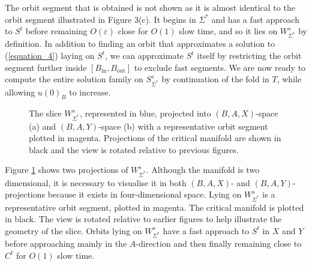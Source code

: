 \documentclass{ws-ijbc}
\begin{document}
The orbit segment that is obtained is not shown as it is almost identical to the orbit segment illustrated in Figure 3(c).  It begins in $\Sigma^*$ and has a fast approach to $S^t$ before remaining $O(\varepsilon)$ close for $O(1)$ slow time, and so it lies on $W^{s}_{\Sigma^*}$ by definition.  In addition to finding an orbit that approximates a solution to (\ref{equation_4}) laying on $S^t$, we can approximate $S^t$ itself by restricting the orbit segment further inside $[B_{\text{in}},B_{\text{out}}]$ to exclude fast segments. We are now ready to compute the entire solution family on $S^s_{\Sigma^*}$ by continuation of the fold in $T$, while allowing $u(0)_B$ to increase.  

\begin{figure}[h]
\centering
{}
\caption{The slice $W^{s}_{\Sigma^*}$, represented in blue, projected into $(B,A,X)$-space (a) and $(B,A,Y)$-space (b) with a representative orbit segment plotted in magenta.  Projections of the critical manifold are shown in black and the view is rotated relative to previous figures.}
\label{piece}
\end{figure}
   
Figure \ref{piece} shows two projections of $W^s_{\Sigma^*}$.  Although the manifold is two dimensional, it is necessary to visualise it in both $(B,A,X)$- and $(B,A,Y)$-projections because it exists in four-dimensional space.  Lying on $W^s_{\Sigma^*}$ is a representative orbit segment, plotted in magenta.  The critical manifold is plotted in black.  The view is rotated relative to earlier figures to help illustrate the geometry of the slice.  Orbits lying on $W^s_{\Sigma^*}$ have a fast approach to $S^t$ in $X$ and $Y$ before approaching mainly in the $A$-direction and then finally remaining close to $C^t$ for $O(1)$ slow time.
    
\end{document}
